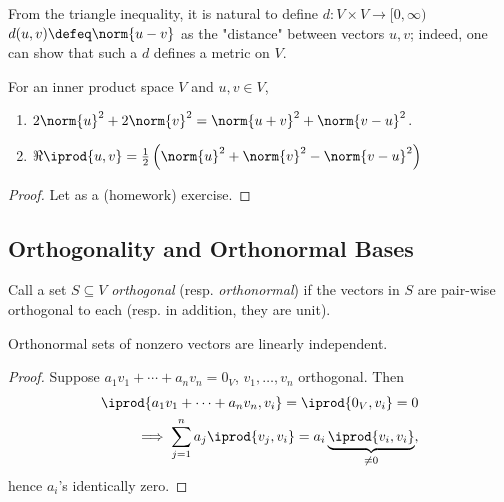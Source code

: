 From the triangle inequality, it is natural to define $d :V \times V \to [0, \infty)$ $d(u, v) \defeq \norm{u - v}$ as the "distance" between vectors $u, v$; indeed, one can show that such a $d$ defines a metric on $V$.

\begin{proposition}
    For an inner product space $V$ and $u, v \in V$, \begin{enumerate}[label=(\alph*)]
        \item $2 \norm{u}^2 + 2 \norm{v}^2 = \norm{u + v}^2  + \norm{v - u}^2$.
        \item $\Re \iprod{u, v} = \frac{1}{2} \left(\norm{u}^2 + \norm{v}^2 - \norm{v - u}^2\right)$
    \end{enumerate}
\end{proposition}
\begin{proof}
    Let as a (homework) exercise.
\end{proof}

\subsection{Orthogonality and Orthonormal Bases}

\begin{definition}
    Call a set $S \subseteq V$ \emph{orthogonal} (resp. \emph{orthonormal}) if the vectors in $S$ are pair-wise orthogonal to each (resp. in addition, they are unit).
\end{definition}

\begin{proposition}
    Orthonormal sets of nonzero vectors are linearly independent.
\end{proposition}
\begin{proof}
    Suppose $a_1 v_1 + \cdots + a_n v_n = 0_V$, $v_1, \dots, v_n$ orthogonal. Then \begin{align*}
        \iprod{a_1 v_1 + \cdots + a_n v_n, v_i} = \iprod{0_V, v_i} = 0\\
        \implies \sum_{j=1}^n a_j \iprod{v_j, v_i} = a_i \underbrace{\iprod{v_i, v_i}}_{\neq 0},
    \end{align*}
    hence $a_i$'s identically zero.
\end{proof}